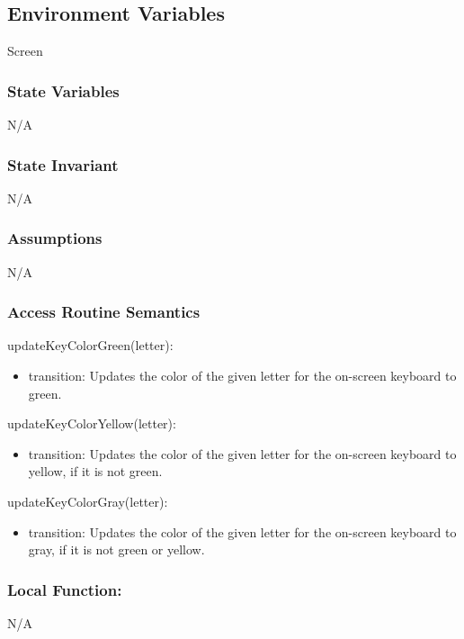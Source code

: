 \documentclass[12pt]{article}
\begin{document}
\subsection*{Environment Variables}

Screen

\subsubsection* {State Variables}
N/A

\subsubsection* {State Invariant}

N/A

\subsubsection* {Assumptions}

N/A

\subsubsection* {Access Routine Semantics}

\noindent updateKeyColorGreen(letter):
\begin{itemize}
  \item transition: Updates the color of the given letter for the on-screen keyboard to green.
\end{itemize}

\noindent updateKeyColorYellow(letter):
\begin{itemize}
  \item transition: Updates the color of the given letter for the on-screen keyboard to yellow, if it is not green.
\end{itemize}

\noindent updateKeyColorGray(letter):
\begin{itemize}
  \item transition: Updates the color of the given letter for the on-screen keyboard to gray, if it is not green or yellow.
\end{itemize}

\subsubsection*{Local Function:}

N/A
\end{document}
